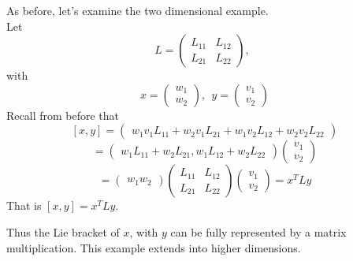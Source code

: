 \documentclass[11 pt]{article}
\newcommand{\br}[2]{\left[#1,#2\right]}
\begin{document}
    \begin{example}
        As before, let's examine the two dimensional example.
\\    Let
    $$
     L = \begin{pmatrix}
            L_{11} & L_{12} \\
            L_{21} & L_{22}
         \end{pmatrix},\ \ 
    $$
    with
    $$
     x = \begin{pmatrix}
            w_1\\
            w_2
         \end{pmatrix},\ \ 
     y = \begin{pmatrix}
             v_1\\
             v_2
         \end{pmatrix}
    $$
    Recall from before that 
    $$
    \br{x}{y} = \begin{pmatrix}
                    w_1v_1L_{11} + w_2v_1L_{21} + w_1v_2L_{12}+w_2v_2L_{22}
                \end{pmatrix}
    $$
    $$
        = \begin{pmatrix}
            w_1L_{11} + w_2L_{21}, w_1L_{12}+w_2L_{22}
        \end{pmatrix}
        \begin{pmatrix}
            v_1 \\
            v_2
        \end{pmatrix}
    $$
    $$
        = \begin{pmatrix}
            w_1 w_2
        \end{pmatrix}
        \begin{pmatrix}
            L_{11} & L_{12} \\
            L_{21} & L_{22}
        \end{pmatrix}
        \begin{pmatrix}
            v_1 \\
            v_2
        \end{pmatrix}
        = x^{T}Ly
    $$
    That is
    $\br{x}{y} = x^TLy$.
    \end{example}
    Thus the Lie bracket of $x$, with $y$ can be fully represented by a matrix
    multiplication.  This example extends into higher dimensions.
\end{document}
